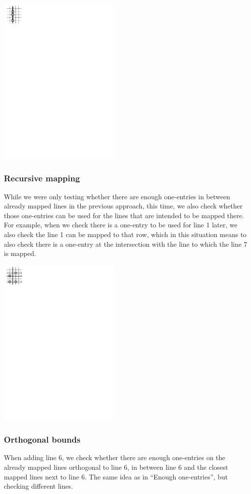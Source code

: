 \centerline{\mbox{\includegraphics[width=60mm]{../img/enough_one-entries.pdf}}}
\subsubsection{Recursive mapping}
While we were only testing whether there are enough one-entries in between already mapped lines in the previous approach, this time, we also check whether those one-entries can be used for the lines that are intended to be mapped there. For example, when we check there is a one-entry to be used for line 1 later, we also check the line 1 can be mapped to that row, which in this situation means to also check there is a one-entry at the intersection with the line to which the line 7 is mapped.

\centerline{\mbox{\includegraphics[width=60mm]{../img/recursive.pdf}}}
\subsubsection{Orthogonal bounds}
When adding line 6, we check whether there are enough one-entries on the already mapped lines orthogonal to line 6, in between line 6 and the closest mapped lines next to line 6. The same idea as in ``Enough one-entries'', but checking different lines.

